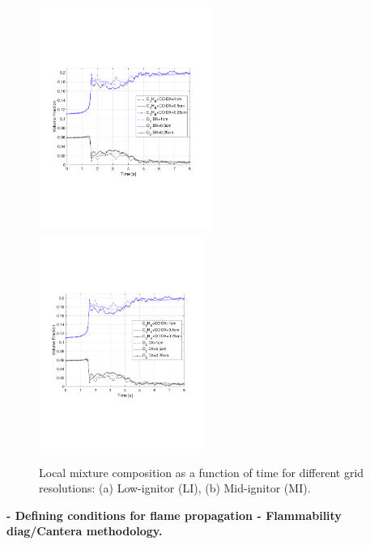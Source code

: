 \documentclass[12pt,letterpaper]{article}
\begin{document}
\begin{flushleft}
\begin{figure}[tb]
    \centering
    \includegraphics[trim = 14.5mm 65mm 17mm 70mm, clip,width=0.505\textwidth]{AOSFST_Paper/Figures/Low_Ignitor_Comp_Tvar_300s.pdf}
    \includegraphics[trim = 22mm 65mm 17mm 70mm, clip,width=0.485\textwidth]{AOSFST_Paper/Figures/Low_Ignitor_Comp_Tvar_300s.pdf}
     \\
    \caption{Local mixture composition as a function of time for different grid resolutions: (a) Low-ignitor (LI), (b) Mid-ignitor (MI). }
    \label{fig:CompSetup}
\end{figure}



\textbf{- Defining conditions for flame propagation - Flammability diag/Cantera methodology.}







\end{flushleft}
\end{document}
